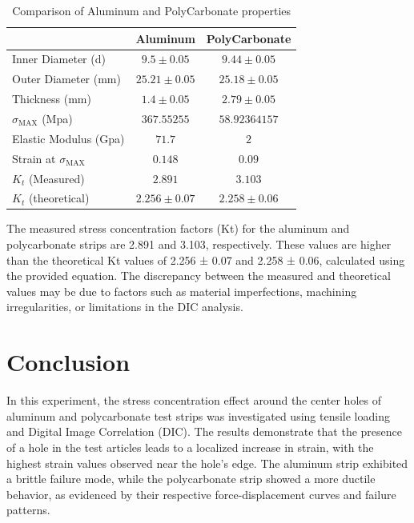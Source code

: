 \documentclass{article}
\begin{document}
\begin{table}[H]
    \centering
    \begin{tabular}{|l|c|c|}
    \hline
     & \textbf{Aluminum} & \textbf{PolyCarbonate} \\ \hline
    Inner Diameter (d) & \(9.5\pm0.05\) & \(9.44\pm0.05\) \\ \hline
    Outer Diameter (mm) & \(25.21\pm0.05\) & \(25.18\pm0.05\) \\ \hline
    Thickness (mm) & \(1.4\pm0.05\) & \(2.79\pm0.05\) \\ \hline
    \(\sigma_{\text{MAX}}\) (Mpa) & \(367.55255\) & \(58.92364157\) \\ \hline
    Elastic Modulus (Gpa) & \(71.7\) & \(2\) \\ \hline
    Strain at \(\sigma_{\text{MAX}}\) & \(0.148\) & \(0.09\) \\ \hline
    \(K_t\) (Measured) & \(2.891\) & \(3.103\) \\ \hline
    \(K_t\) (theoretical) & \(2.256\pm0.07\) & \(2.258\pm0.06\) \\ \hline
    \end{tabular}
    \caption{Comparison of Aluminum and PolyCarbonate properties}
    \label{table:materials}
\end{table}
    
The measured stress concentration factors (Kt) for the aluminum and polycarbonate strips are 2.891 and 3.103, respectively. These values are higher than the theoretical Kt values of 2.256 ± 0.07 and 2.258 ± 0.06, calculated using the provided equation. The discrepancy between the measured and theoretical values may be due to factors such as material imperfections, machining irregularities, or limitations in the DIC analysis.
 
\section{Conclusion}

In this experiment, the stress concentration effect around the center holes of aluminum and polycarbonate test strips was investigated using tensile loading and Digital Image Correlation (DIC). The results demonstrate that the presence of a hole in the test articles leads to a localized increase in strain, with the highest strain values observed near the hole's edge. The aluminum strip exhibited a brittle failure mode, while the polycarbonate strip showed a more ductile behavior, as evidenced by their respective force-displacement curves and failure patterns. \\
\end{document}
